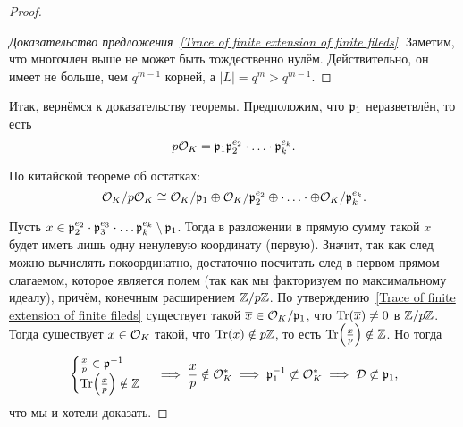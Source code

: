 \begin{proof}
\begin{proof}[Доказательство предложения~\ref{Trace of finite extension of finite fileds}]
	 		Заметим, что многочлен выше не может быть тождественно нулём. Действительно, он имеет не больше, чем $q^{m - 1}$ корней, а $|L| = q^m > q^{m - 1}$.
	 	\end{proof}

	 	Итак,  вернёмся к доказательству теоремы.  Предположим, что $\mathfrak{p}_{1}$ неразветвлён, то есть
	 	\[
	 		p\mathcal{O}_{K} = \mathfrak{p}_{1} \mathfrak{p}_{2}^{e_{2}} \cdot \ldots \cdot \mathfrak{p}_{k}^{e_k}.
	 	\]

	 	По китайской теореме об остатках:
	 	\[
	 		\mathcal{O}_{K}/p\mathcal{O}_{K} \cong \mathcal{O}_{K}/\mathfrak{p}_{1} \oplus \mathcal{O}_{K}/\mathfrak{p}_{2}^{e_2} \oplus \cdot \ldots \cdot \oplus \mathcal{O}_{K}/\mathfrak{p}_{k}^{e_k}.
	 	\]

	 	Пусть $x \in \mathfrak{p}_{2}^{e_2} \cdot \mathfrak{p}_{3}^{e_3} \cdot \ldots \mathfrak{p}_{k}^{e_k} \setminus \mathfrak{p}_{1}$. Тогда в разложении в прямую сумму такой $x$ будет иметь лишь одну ненулевую координату (первую). Значит, так как след можно вычислять покоординатно, достаточно посчитать след в первом прямом слагаемом, которое является полем (так как мы факторизуем по максимальному идеалу), причём, конечным расширением $\mathbb{Z}/p\mathbb{Z}$. По утверждению~\ref{Trace of finite extension of finite fileds} существует такой $\overline{x} \in \mathcal{O}_{K}/\mathfrak{p}_{1}$, что $\operatorname{Tr}(\overline{x}) \neq 0$ в $\mathbb{Z}/p\mathbb{Z}$. Тогда существует $x \in \mathcal{O}_{K}$ такой, что $\operatorname{Tr}(x) \notin p\mathbb{Z}$, то есть $\Tr\lr*{\frac{x}{p}} \notin \Z$. Но тогда 
	 	\[
	 		\begin{cases} \frac{x}{p} \in \fp^{-1} \\ \Tr\lr*{\frac{x}{p}} \notin \Z \end{cases} \implies \frac{x}{p} \notin \cO_{K}^{*} \implies \fp_{1}^{-1} \not\subset \cO_{K}^{*} \implies \cD \not\subset \fp_{1},
	 	\]
	 	что мы и хотели доказать. 
	 \end{proof}

